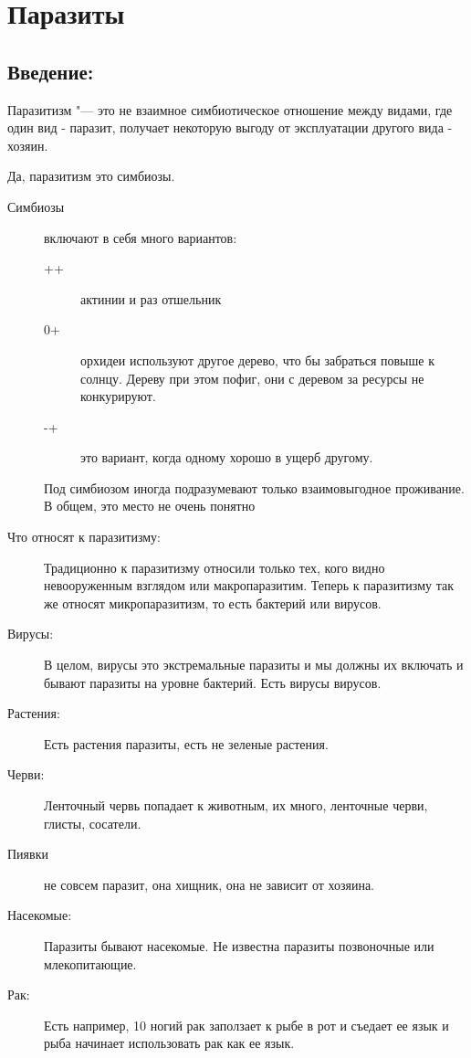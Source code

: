 ﻿\section{Паразиты}
\subsection{Введение:}
\begin{Def}
Паразитизм "--- это не взаимное симбиотическое отношение между 
видами, где один вид - паразит, получает некоторую выгоду от 
эксплуатации другого вида - хозяин. 
\end{Def}

Да, паразитизм это симбиозы. 
\begin{description}
\item[Симбиозы] включают в себя много вариантов: 
\begin{description}
\item[++] актинии и раз отшельник
\item[0+] орхидеи используют другое дерево, что бы 
забраться повыше к солнцу. Дереву при этом пофиг, 
они с деревом за ресурсы не конкурируют.
\item[-+] это вариант, когда одному хорошо в ущерб другому. 
\end{description}

Под симбиозом иногда подразумевают только взаимовыгодное 
проживание. В общем, это место не очень понятно \TODO

\item[Что относят к паразитизму:]

Традиционно к паразитизму относили только тех, 
кого видно невооруженным взглядом или макропаразитим. 
Теперь к паразитизму так же относят микропаразитизм, 
то есть бактерий или вирусов. 

\item[Вирусы:] В целом, вирусы это экстремальные паразиты и мы должны
их включать и бывают паразиты на уровне бактерий. 
Есть вирусы вирусов. 

\item[Растения:] Есть растения паразиты, есть не зеленые растения. 

\item[Черви:] Ленточный червь попадает к животным, их много, 
ленточные черви, глисты, сосатели. 

\item[Пиявки] не совсем паразит, она хищник, она не зависит от хозяина. 

\item[Насекомые:] Паразиты бывают насекомые. Не известна паразиты позвоночные или 
млекопитающие. 

\item[Рак:] Есть например, 10 ногий рак заползает к рыбе в рот и съедает ее язык и рыба начинает использовать 
рак как ее язык.
\end{description}

